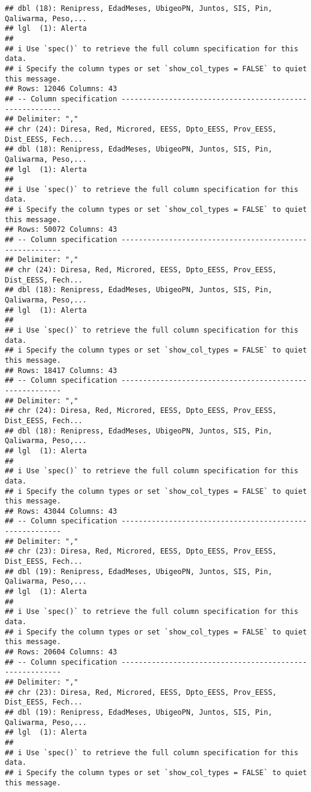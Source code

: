 \documentclass[
]{article}
\begin{document}
\begin{verbatim}
## dbl (18): Renipress, EdadMeses, UbigeoPN, Juntos, SIS, Pin, Qaliwarma, Peso,...
## lgl  (1): Alerta
## 
## i Use `spec()` to retrieve the full column specification for this data.
## i Specify the column types or set `show_col_types = FALSE` to quiet this message.
## Rows: 12046 Columns: 43
## -- Column specification --------------------------------------------------------
## Delimiter: ","
## chr (24): Diresa, Red, Microred, EESS, Dpto_EESS, Prov_EESS, Dist_EESS, Fech...
## dbl (18): Renipress, EdadMeses, UbigeoPN, Juntos, SIS, Pin, Qaliwarma, Peso,...
## lgl  (1): Alerta
## 
## i Use `spec()` to retrieve the full column specification for this data.
## i Specify the column types or set `show_col_types = FALSE` to quiet this message.
## Rows: 50072 Columns: 43
## -- Column specification --------------------------------------------------------
## Delimiter: ","
## chr (24): Diresa, Red, Microred, EESS, Dpto_EESS, Prov_EESS, Dist_EESS, Fech...
## dbl (18): Renipress, EdadMeses, UbigeoPN, Juntos, SIS, Pin, Qaliwarma, Peso,...
## lgl  (1): Alerta
## 
## i Use `spec()` to retrieve the full column specification for this data.
## i Specify the column types or set `show_col_types = FALSE` to quiet this message.
## Rows: 18417 Columns: 43
## -- Column specification --------------------------------------------------------
## Delimiter: ","
## chr (24): Diresa, Red, Microred, EESS, Dpto_EESS, Prov_EESS, Dist_EESS, Fech...
## dbl (18): Renipress, EdadMeses, UbigeoPN, Juntos, SIS, Pin, Qaliwarma, Peso,...
## lgl  (1): Alerta
## 
## i Use `spec()` to retrieve the full column specification for this data.
## i Specify the column types or set `show_col_types = FALSE` to quiet this message.
## Rows: 43044 Columns: 43
## -- Column specification --------------------------------------------------------
## Delimiter: ","
## chr (23): Diresa, Red, Microred, EESS, Dpto_EESS, Prov_EESS, Dist_EESS, Fech...
## dbl (19): Renipress, EdadMeses, UbigeoPN, Juntos, SIS, Pin, Qaliwarma, Peso,...
## lgl  (1): Alerta
## 
## i Use `spec()` to retrieve the full column specification for this data.
## i Specify the column types or set `show_col_types = FALSE` to quiet this message.
## Rows: 20604 Columns: 43
## -- Column specification --------------------------------------------------------
## Delimiter: ","
## chr (23): Diresa, Red, Microred, EESS, Dpto_EESS, Prov_EESS, Dist_EESS, Fech...
## dbl (19): Renipress, EdadMeses, UbigeoPN, Juntos, SIS, Pin, Qaliwarma, Peso,...
## lgl  (1): Alerta
## 
## i Use `spec()` to retrieve the full column specification for this data.
## i Specify the column types or set `show_col_types = FALSE` to quiet this message.

\end{verbatim}
\end{document}
